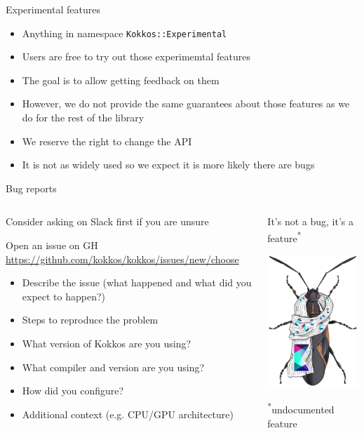 \begin{frame}[fragile]{Experimental features}

\begin{itemize}
\item Anything in namespace \texttt{Kokkos::Experimental}
\item Users are free to try out those experimemtal features
\item The goal is to allow getting feedback on them
\item However, we do not provide the same guarantees about those features as we do for the rest of the library
  \item We reserve the right to change the API
  \item It is not as widely used so we expect it is more likely there are bugs
\end{itemize}
\end{frame}

\begin{frame}[fragile]{Bug reports}

\begin{columns}
  \begin{column}{0.65\textwidth}
  Consider asking on Slack first if you are unsure

  Open an issue on GH
  {\footnotesize \url{https://github.com/kokkos/kokkos/issues/new/choose}}
  \begin{itemize}
  \item Describe the issue (what happened and what did you expect to happen?)
  \item Steps to reproduce the problem
  \item What version of Kokkos are you using?
  \item What compiler and version are you using?
  \item How did you configure?
  \item Additional context (e.g. CPU/GPU architecture)
  \end{itemize}
  \end{column}
  \begin{column}{0.35\textwidth}
  It's not a bug, it's a feature\textsuperscript{*}
  \begin{center} \includegraphics[height=5cm]{figures/kokkos-feature1} \end{center}
  {\tiny \textsuperscript{*}undocumented feature}
  \end{column}
\end{columns}
\end{frame}

